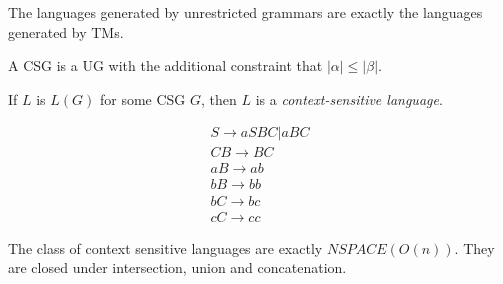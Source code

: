 \begin{theorem}
  The languages generated by unrestricted grammars are exactly the languages
  generated by TMs.
\end{theorem}

\begin{definition}
  A CSG is a UG with the additional constraint that $\left| \alpha \right| \le
  \left| \beta \right| $.
\end{definition}
\begin{definition}
  If $L$ is $L(G)$ for some CSG $G$, then $L$ is a \textit{context-sensitive language}.
\end{definition}
\begin{example}
   \begin{gather*}
     S\to aSBC|aBC\\
     CB\to BC\\
     aB\to ab\\
     bB\to bb\\
     bC\to bc\\
     cC\to cc
   \end{gather*}
\end{example}

\begin{remark}
  The class of context sensitive languages are exactly $NSPACE\left( O\left( n
  \right)  \right) $. They are closed under intersection, union and concatenation.
\end{remark}
